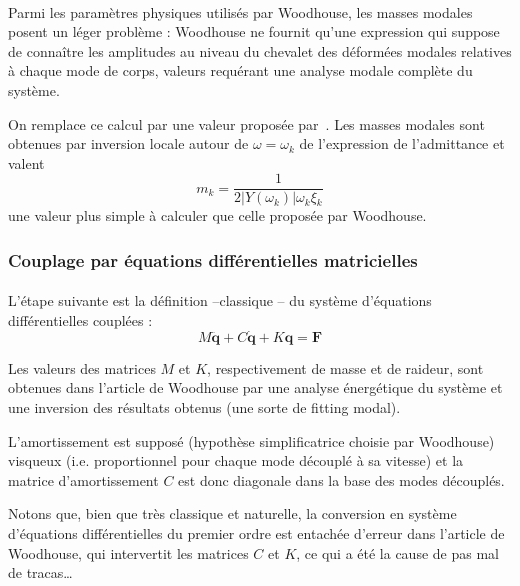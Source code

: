 
\paragraph*{}

Parmi les paramètres physiques utilisés par Woodhouse, les masses modales
posent un léger problème : Woodhouse ne fournit qu'une expression qui suppose
de connaître les amplitudes au niveau du chevalet des déformées modales
relatives à chaque mode de corps, valeurs requérant une analyse modale
complète du système.
  
  On remplace ce calcul par une valeur proposée par~\textcite{pate14:phd}.
  Les masses modales sont obtenues par inversion locale autour de
\( \omega = \omega_k \) de l'expression de l'admittance et
valent \[ m_k = \frac{1}{2 |Y(\omega_k)| \omega{}_k \xi{}_k} \] une valeur plus
simple à calculer que celle proposée par Woodhouse.

\subsubsection{Couplage par équations différentielles matricielles}

  \paragraph*{}
  L'étape suivante est la définition --classique -- du système d'équations
différentielles cou\-plées :
\[ M \ddot{\bm{q}} + C \dot{\bm{q}} + K \bm{q} = \bm{F} \]

  Les valeurs des matrices \( M \) et \( K \), respectivement de masse et de
raideur, sont obtenues dans l'article de Woodhouse par une analyse énergétique
du système et une inversion des résultats obtenus (une sorte de fitting modal).

  L'amortissement est supposé (hypothèse simplificatrice choisie par Woodhouse)
visqueux (i.e. proportionnel pour chaque mode découplé à sa vitesse) et la
matrice d'amortissement \( C \) est donc diagonale dans la base des
modes découplés.

Notons que, bien que très classique et naturelle, la conversion en système
d'équations différentielles du premier ordre est entachée d'erreur dans
l'article de Woodhouse, qui intervertit les matrices \( C \) et \( K \), ce
qui a été la cause de pas mal de tracas\dots

